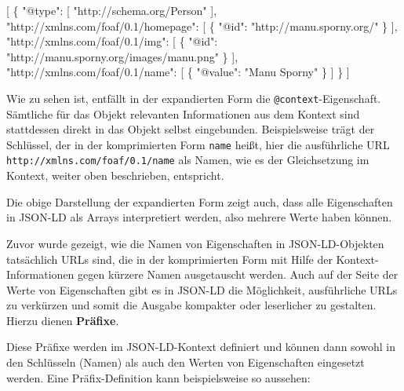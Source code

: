 \documentclass[,a4paper]{article}
\newenvironment{Shaded}{}{}
\newcommand{\DataTypeTok}[1]{\textcolor[rgb]{0.56,0.13,0.00}{{#1}}}
\newcommand{\StringTok}[1]{\textcolor[rgb]{0.25,0.44,0.63}{{#1}}}
\newcommand{\OtherTok}[1]{\textcolor[rgb]{0.00,0.44,0.13}{{#1}}}
\newcommand{\FunctionTok}[1]{\textcolor[rgb]{0.02,0.16,0.49}{{#1}}}
\begin{document}
\begin{Shaded}
\begin{Highlighting}[]
\OtherTok{[}
    \FunctionTok{\{}
        \DataTypeTok{"@type"}\FunctionTok{:} \OtherTok{[}
            \StringTok{"http://schema.org/Person"}
        \OtherTok{]}\FunctionTok{,}
        \DataTypeTok{"http://xmlns.com/foaf/0.1/homepage"}\FunctionTok{:} \OtherTok{[}
            \FunctionTok{\{}
                \DataTypeTok{"@id"}\FunctionTok{:} \StringTok{"http://manu.sporny.org/"}
            \FunctionTok{\}}
        \OtherTok{]}\FunctionTok{,}
        \DataTypeTok{"http://xmlns.com/foaf/0.1/img"}\FunctionTok{:} \OtherTok{[}
            \FunctionTok{\{}
                \DataTypeTok{"@id"}\FunctionTok{:} \StringTok{"http://manu.sporny.org/images/manu.png"}
            \FunctionTok{\}}
        \OtherTok{]}\FunctionTok{,}
        \DataTypeTok{"http://xmlns.com/foaf/0.1/name"}\FunctionTok{:} \OtherTok{[}
            \FunctionTok{\{}
                \DataTypeTok{"@value"}\FunctionTok{:} \StringTok{"Manu Sporny"}
            \FunctionTok{\}}
        \OtherTok{]}
    \FunctionTok{\}}
\OtherTok{]}
\end{Highlighting}
\end{Shaded}

Wie zu sehen ist, entfällt in der expandierten Form die
\texttt{@context}-Eigenschaft. Sämtliche für das Objekt relevanten
Informationen aus dem Kontext sind stattdessen direkt in das Objekt
selbst eingebunden. Beispielsweise trägt der Schlüssel, der in der
komprimierten Form \texttt{name} heißt, hier die ausführliche URL
\texttt{http://xmlns.com/foaf/0.1/name} als Namen, wie es der
Gleichsetzung im Kontext, weiter oben beschrieben, entspricht.

Die obige Darstellung der expandierten Form zeigt auch, dass alle
Eigenschaften in JSON-LD als Arrays interpretiert werden, also mehrere
Werte haben können.

Zuvor wurde gezeigt, wie die Namen von Eigenschaften in JSON-LD-Objekten
tatsächlich URLs sind, die in der komprimierten Form mit Hilfe der
Kontext-Informationen gegen kürzere Namen ausgetauscht werden. Auch auf
der Seite der Werte von Eigenschaften gibt es in JSON-LD die
Möglichkeit, ausführliche URLs zu verkürzen und somit die Ausgabe
kompakter oder leserlicher zu gestalten. Hierzu dienen \textbf{Präfixe}.

Diese Präfixe werden im JSON-LD-Kontext definiert und können dann sowohl
in den Schlüsseln (Namen) als auch den Werten von Eigenschaften
eingesetzt werden. Eine Präfix-Definition kann beispielsweise so
aussehen:
\end{document}
